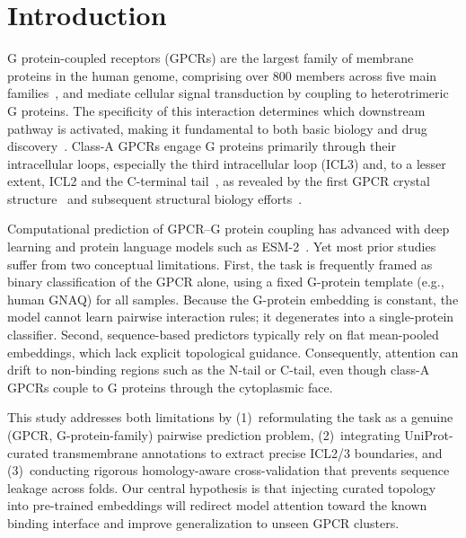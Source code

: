 \documentclass[11pt,a4paper]{article}
\begin{document}
\newpage
\setcounter{page}{1}

\section{Introduction}

G protein-coupled receptors (GPCRs) are the largest family of membrane proteins in the human genome, comprising over 800 members across five main families~\cite{fredriksson2003gpcr,lagerstrom2008structural}, and mediate cellular signal transduction by coupling to heterotrimeric G proteins. The specificity of this interaction determines which downstream pathway is activated, making it fundamental to both basic biology and drug discovery~\cite{wootten2018mechanisms}. Class-A GPCRs engage G proteins primarily through their intracellular loops, especially the third intracellular loop (ICL3) and, to a lesser extent, ICL2 and the C-terminal tail~\cite{flock2015universal,ma2022structural}, as revealed by the first GPCR crystal structure~\cite{palczewski2000crystal} and subsequent structural biology efforts~\cite{katritch2013structure}.

Computational prediction of GPCR--G protein coupling has advanced with deep learning and protein language models such as ESM-2~\cite{rives2021biological,lin2023evolutionary}. Yet most prior studies suffer from two conceptual limitations. First, the task is frequently framed as binary classification of the GPCR alone, using a fixed G-protein template (e.g., human GNAQ) for all samples. Because the G-protein embedding is constant, the model cannot learn pairwise interaction rules; it degenerates into a single-protein classifier. Second, sequence-based predictors typically rely on flat mean-pooled embeddings, which lack explicit topological guidance. Consequently, attention can drift to non-binding regions such as the N-tail or C-tail, even though class-A GPCRs couple to G proteins through the cytoplasmic face.

This study addresses both limitations by (1)~reformulating the task as a genuine (GPCR, G-protein-family) pairwise prediction problem, (2)~integrating UniProt-curated transmembrane annotations to extract precise ICL2/3 boundaries, and (3)~conducting rigorous homology-aware cross-validation that prevents sequence leakage across folds. Our central hypothesis is that injecting curated topology into pre-trained embeddings will redirect model attention toward the known binding interface and improve generalization to unseen GPCR clusters.
\end{document}
